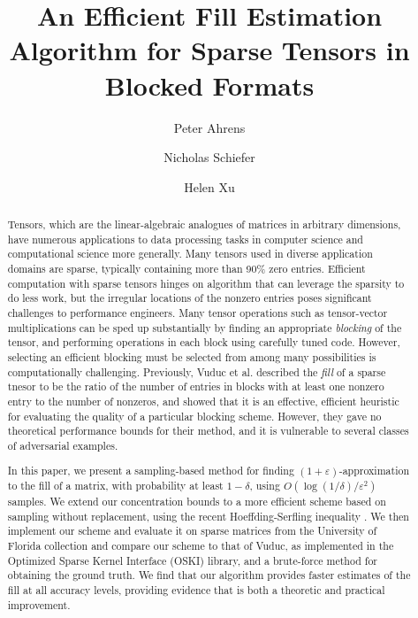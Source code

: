 \documentclass{article}
\title{An Efficient Fill Estimation Algorithm for Sparse Tensors in Blocked Formats}
\author{Peter Ahrens \and Nicholas Schiefer \and Helen Xu}
\date{}
\theoremstyle{dfn}
\numberwithin{equation}{section}
\numberwithin{figure}{section}
\renewcommand{\epsilon}{\varepsilon}
\newcommand{\eps} {\epsilon}
\begin{document}
  \maketitle

\begin{abstract}
Tensors, which are the linear-algebraic analogues of matrices in arbitrary dimensions, have numerous applications to data processing tasks in computer science and computational science more generally.
Many tensors used in diverse application domains are sparse, typically containing more than 90\% zero entries.
Efficient computation with sparse tensors hinges on algorithm that can leverage the sparsity to do less work, but the irregular locations of the nonzero entries poses significant challenges to performance engineers.
Many tensor operations such as tensor-vector multiplications can be sped up substantially by finding an appropriate \emph{blocking} of the tensor, and performing operations in each block using carefully tuned code.
However, selecting an efficient blocking must be selected from among many possibilities is computationally challenging.
Previously, Vuduc et al. \cite{VuducDeYe02, VuducDeYe05}  described the \emph{fill} of a sparse tnesor to be the ratio of the number of entries in blocks with at least one nonzero entry to the number of nonzeros, and showed that it is an effective, efficient heuristic for evaluating the quality of a particular blocking scheme.
However, they gave no theoretical performance bounds for their method, and it is vulnerable to several classes of adversarial examples.

In this paper, we present a sampling-based method for finding $(1 + \eps)$-approximation to the fill of a matrix, with probability at least $1 - \delta$, using $O(\log(1/\delta)/\eps^2)$ samples.
We extend our concentration bounds to a more efficient scheme based on sampling without replacement, using the recent Hoeffding-Serfling inequality \cite{BF2015}.
We then implement our scheme and evaluate it on sparse matrices from the University of Florida collection and compare our scheme to that of Vuduc, as implemented in the Optimized Sparse Kernel Interface (OSKI) library, and a brute-force method for obtaining the ground truth. We find that our algorithm provides faster estimates of the fill at all accuracy levels, providing evidence that is both a theoretic and practical improvement.
\end{abstract}


  








%

\end{document}
